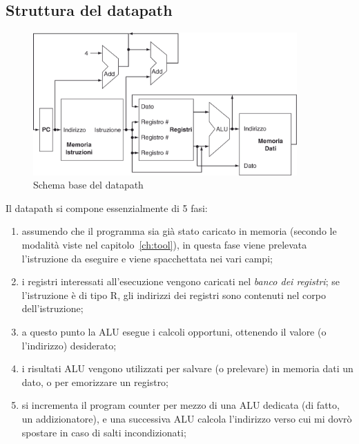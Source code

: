\documentclass[class=book, crop=false, oneside]{standalone}
\begin{document}
\subsection{Struttura del datapath}
\begin{figure}[H]
	\centering
	\includegraphics[width=0.9\textwidth,keepaspectratio]{datap_1}
	\caption{Schema base del datapath}
\end{figure}
Il datapath si compone essenzialmente di 5 fasi:
\begin{enumerate}
  \item assumendo che il programma sia già stato caricato in memoria (secondo le modalità viste nel capitolo~\ref{ch:tool}), in questa fase viene prelevata l'istruzione da eseguire e viene spacchettata nei vari campi;
  \item i registri interessati all'esecuzione vengono caricati nel \emph{banco dei registri}; se l'istruzione è di tipo R, gli indirizzi dei registri sono contenuti nel corpo dell'istruzione;
  \item a questo punto la ALU esegue i calcoli opportuni, ottenendo il valore (o l’indirizzo) desiderato;
  \item i risultati ALU vengono utilizzati per salvare (o prelevare) in memoria dati un dato, o per emorizzare un registro;
  \item si incrementa il program counter per mezzo di una ALU dedicata (di fatto, un addizionatore), e una successiva ALU calcola l’indirizzo verso cui mi dovrò spostare in caso di salti incondizionati;
\end{enumerate}
\end{document}
